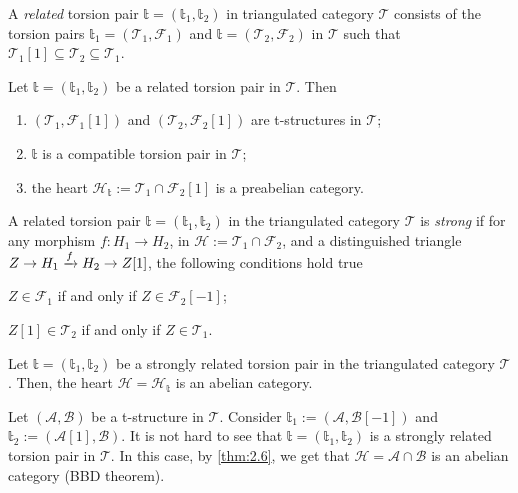 \begin{definition}
  A \emph{related} torsion pair $\mathbb{t}=(\mathbb{t}_1,\mathbb{t}_2)$ in triangulated category
  $\mathcal{T}$ consists of the torsion pairs $\mathbb{t}_1=(\mathcal{T}_1,\mathcal{F}_1)$
  and $\mathbb{t}=(\mathcal{T}_2,\mathcal{F}_2)$ in $\mathcal{T}$ such that
  $\mathcal{T}_1[1]\subseteq \mathcal{T}_2\subseteq\mathcal{T}_1$.
\end{definition}

\begin{prop}
  Let $\mathbb{t}=(\mathbb{t}_1,\mathbb{t}_2)$ be a related torsion pair in $\mathcal{T}$. Then
  \begin{enumerate}[label=(\alph*)]
    \item $(\mathcal{T}_1,\mathcal{F}_1[1])$ and $(\mathcal{T}_2,\mathcal{F}_2[1])$
    are t-structures in $\mathcal{T}$;
    \item $\mathbb{t}$ is a compatible torsion pair in $\mathcal{T}$;
    \item the heart $\mathcal{H}_\mathbb{t} := \mathcal{T}_1\cap\mathcal{F}_2[1]$ is a preabelian category.
  \end{enumerate}
\end{prop}

\begin{definition}
  A related torsion pair $\mathbb{t}=(\mathbb{t}_1,\mathbb{t}_2)$ in the triangulated category
  $\mathcal{T}$ is \emph{strong} if for any morphism $f:H_1\to H_2$, in $\mathcal{H}:=\mathcal{T}_1\cap\mathcal{F}_2$,
  and a distinguished triangle $Z\to H_1\xrightarrow{f}H_2\to Z[1]$, the following conditions
  hold true
  \begin{relatedtorsion}
    \item $Z\in\mathcal{F}_1$ if and only if $Z\in\mathcal{F}_2[-1]$;
    \item $Z[1]\in\mathcal{T}_2$ if and only if $Z\in\mathcal{T}_1$.
  \end{relatedtorsion}
\end{definition}

\begin{thm}\label{thm:2.6}
  Let $\mathbb{t}=(\mathbb{t}_1,\mathbb{t}_2)$ be a strongly related torsion pair in
  the triangulated category $\mathcal{T}$. Then, the heart $\mathcal{H}=\mathcal{H}_\mathbb{t}$
  is an abelian category.
\end{thm}

\begin{example}
  Let $(\mathcal{A},\mathcal{B})$ be a t-structure in $\mathcal{T}$. Consider
  $\mathbb{t}_1:=(\mathcal{A},\mathcal{B}[-1])$ and $\mathbb{t}_2 :=(\mathcal{A}[1],\mathcal{B})$.
  It is not hard to see that $\mathbb{t}=(\mathbb{t}_1,\mathbb{t}_2)$ is a strongly related
  torsion pair in $\mathcal{T}$. In this case, by \cref{thm:2.6}, we get that $\mathcal{H}=\mathcal{A}\cap\mathcal{B}$
  is an abelian category (BBD theorem).
\end{example}


